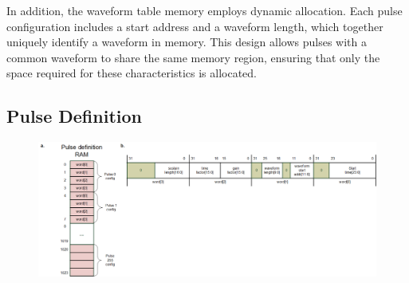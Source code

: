
In addition, the waveform table memory employs dynamic allocation. Each pulse configuration includes a start address and a waveform length, which together uniquely identify a waveform in memory. This design allows pulses with a common waveform to share the same memory region, ensuring that only the space required for these characteristics is allocated.

\subsection{Pulse Definition}

\begin{figure}[htbp]
    \setlength{\abovecaptionskip}{0pt}    %
    \setlength{\belowcaptionskip}{0pt}    %
    \centering
    \includegraphics[width=1\linewidth]{figures/3.2.png}
    \caption{}
    \label{fig:pd}
\end{figure}

